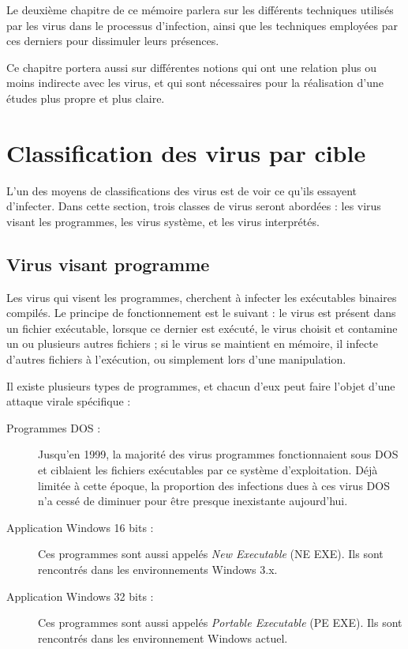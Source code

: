 
Le deuxième chapitre de ce mémoire parlera sur les différents techniques utilisés par les virus 
dans le processus d'infection, ainsi que les techniques employées par ces derniers pour dissimuler leurs présences.

Ce chapitre portera aussi sur différentes notions qui ont une relation plus ou moins indirecte avec les virus,
et qui sont nécessaires pour la réalisation d'une études plus propre et plus claire.

\newpage


\section{Classification des virus par cible}
L'un des moyens de classifications des virus est de voir ce qu'ils essayent d'infecter.
Dans cette section, trois classes de virus seront abordées : les virus visant les programmes, les virus système,
et les virus interprétés.

    \subsection{Virus visant programme}
    Les virus qui visent les programmes, cherchent à infecter les exécutables binaires compilés. 
    Le principe de fonctionnement est le suivant : le virus est présent dans un fichier exécutable, lorsque 
    ce dernier est exécuté, le virus choisit et contamine un ou plusieurs autres fichiers ; si le virus se maintient
    en mémoire, il infecte d'autres fichiers à l'exécution, ou simplement lors d'une manipulation. %

    Il existe plusieurs types de programmes, et chacun d'eux peut faire l'objet d'une attaque virale spécifique :
    \begin{description}
        \item[Programmes DOS :] Jusqu’en 1999, la majorité des virus programmes fonctionnaient sous 
            DOS et ciblaient les fichiers exécutables par ce système d'exploitation. 
            Déjà limitée à cette époque, la proportion des infections dues à ces virus DOS n’a cessé 
            de diminuer pour être presque inexistante aujourd’hui.
        \item[Application Windows 16 bits :] Ces programmes sont aussi appelés \emph{New Executable} (NE EXE).
            Ils sont rencontrés dans les environnements Windows 3.x. 
        \item[Application Windows 32 bits :] Ces programmes sont aussi appelés \emph{Portable Executable}
            (PE EXE). Ils sont rencontrés dans les environnement Windows actuel.
    \end{description}

